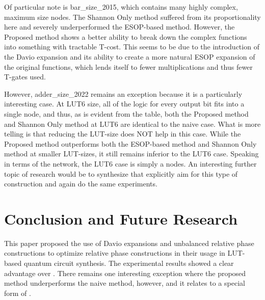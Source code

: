 \documentclass[paper]{ieice}
\providecommand{\DIFadd}[1]{{\protect\color{blue}{#1}}} %
\providecommand{\DIFaddbegin}{} %
\providecommand{\DIFaddend}{} %
\newcommand{\DIFaddincludegraphics}[2][]{{\color{blue}\fbox{\DIFOincludegraphics[#1]{#2}}}} %
\DeclareRobustCommand{\DIFaddbegin}{\DIFOaddbegin \let\includegraphics\DIFaddincludegraphics} %
\DeclareRobustCommand{\DIFaddend}{\DIFOaddend \let\includegraphics\DIFOincludegraphics} %
\begin{document}
Of particular note is bar\_size\_2015, which contains many highly complex, maximum size nodes. The Shannon Only
method suffered from its  \DIFaddbegin \DIFadd{$2^{n-1}$ }\DIFaddend proportionality here and severely underperformed the ESOP-based method.
However, the Proposed method shows a better ability to break down the complex functions into something
with tractable T-cost. This seems to be due to the introduction of the Davio expansion and its ability
to create a more natural ESOP expansion of the original functions, which lends itself to fewer multiplications
and thus fewer T-gates used.

However, adder\_size\_2022 remains an exception because it is a particularly interesting case. At LUT6 size,
all of the logic for every output bit fits into a single node, and thus, as is evident from the table,
both the Proposed method and Shannon Only method at LUT6 are identical to the naive case. What is more telling is
that reducing the LUT-size does NOT help in this case. While the Proposed method outperforms both the ESOP-based
method and Shannon Only method at smaller LUT-sizes, it still remains inferior to the LUT6 case. Speaking in terms
of the  \DIFaddbegin \DIFadd{Boolean logic }\DIFaddend network, the LUT6 case is simply a  \DIFaddbegin \DIFadd{set of independent output }\DIFaddend nodes. An interesting further topic of research would be
to synthesize  \DIFaddbegin \DIFadd{Boolean logic networks }\DIFaddend that explicitly aim for this type of construction and again do the same experiments. 



\vspace*{-0.25cm}
\section{Conclusion and Future Research}
\label{Sec:concl}
 This paper proposed the use of \DIFaddbegin \DIFadd{Shannon's Decomposition, }\DIFaddend Davio expansions and \DIFaddbegin \DIFadd{alternating
balanced/ }\DIFaddend unbalanced relative phase constructions to optimize relative phase constructions
in their usage in LUT-based quantum circuit synthesis.  The experimental results showed a
clear advantage over  \DIFaddbegin \DIFadd{the naive case, and Davio Expansions and balanced/unblanced constructions
prove effective at dealing with corner cases that hinder the Shannon Only case }\DIFaddend . There remains 
one interesting exception where the proposed method underperforms the naive method, however, 
and it relates to a special form of  \DIFaddbegin \DIFadd{Boolean logic network which consists of independent output gates }\DIFaddend .
\end{document}

